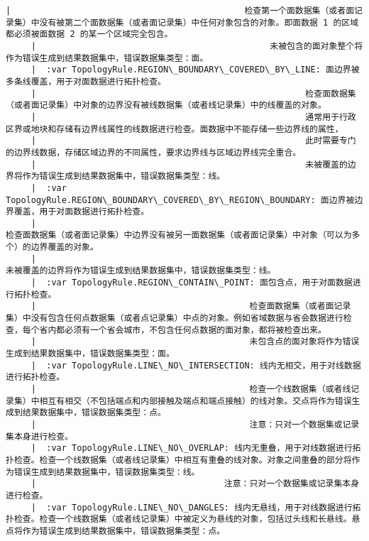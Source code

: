\documentclass[11pt]{article}
\begin{document}
\begin{Verbatim}[commandchars=\\\{\}]
     |                                              检查第一个面数据集（或者面记录集）中没有被第二个面数据集（或者面记录集）中任何对象包含的对象。即面数据 1 的区域都必须被面数据 2 的某一个区域完全包含。
     |                                              未被包含的面对象整个将作为错误生成到结果数据集中，错误数据集类型：面。
     |  :var TopologyRule.REGION\_BOUNDARY\_COVERED\_BY\_LINE: 面边界被多条线覆盖，用于对面数据进行拓扑检查。
     |                                                     检查面数据集（或者面记录集）中对象的边界没有被线数据集（或者线记录集）中的线覆盖的对象。
     |                                                     通常用于行政区界或地块和存储有边界线属性的线数据进行检查。面数据中不能存储一些边界线的属性，
     |                                                     此时需要专门的边界线数据，存储区域边界的不同属性，要求边界线与区域边界线完全重合。
     |                                                     未被覆盖的边界将作为错误生成到结果数据集中，错误数据集类型：线。
     |  :var TopologyRule.REGION\_BOUNDARY\_COVERED\_BY\_REGION\_BOUNDARY: 面边界被边界覆盖，用于对面数据进行拓扑检查。
     |                                                                检查面数据集（或者面记录集）中边界没有被另一面数据集（或者面记录集）中对象（可以为多个）的边界覆盖的对象。
     |                                                                未被覆盖的边界将作为错误生成到结果数据集中，错误数据集类型：线。
     |  :var TopologyRule.REGION\_CONTAIN\_POINT: 面包含点，用于对面数据进行拓扑检查。
     |                                          检查面数据集（或者面记录集）中没有包含任何点数据集（或者点记录集）中点的对象。例如省域数据与省会数据进行检查，每个省内都必须有一个省会城市，不包含任何点数据的面对象，都将被检查出来。
     |                                          未包含点的面对象将作为错误生成到结果数据集中，错误数据集类型：面。
     |  :var TopologyRule.LINE\_NO\_INTERSECTION: 线内无相交，用于对线数据进行拓扑检查。
     |                                          检查一个线数据集（或者线记录集）中相互有相交（不包括端点和内部接触及端点和端点接触）的线对象。交点将作为错误生成到结果数据集中，错误数据集类型：点。
     |                                          注意：只对一个数据集或记录集本身进行检查。
     |  :var TopologyRule.LINE\_NO\_OVERLAP: 线内无重叠，用于对线数据进行拓扑检查。检查一个线数据集（或者线记录集）中相互有重叠的线对象。对象之间重叠的部分将作为错误生成到结果数据集中，错误数据集类型：线。
     |                                     注意：只对一个数据集或记录集本身进行检查。
     |  :var TopologyRule.LINE\_NO\_DANGLES: 线内无悬线，用于对线数据进行拓扑检查。检查一个线数据集（或者线记录集）中被定义为悬线的对象，包括过头线和长悬线。悬点将作为错误生成到结果数据集中，错误数据集类型：点。

\end{Verbatim}
\end{document}
